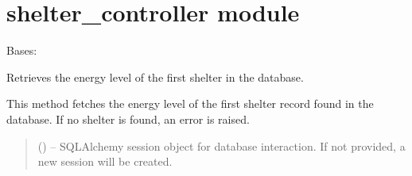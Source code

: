 \documentclass[letterpaper,10pt,english]{sphinxmanual}
\begin{document}
\section{shelter\_controller module}
\label{\detokenize{app.controllers:module-app.controllers.shelter_controller}}\label{\detokenize{app.controllers:shelter-controller-module}}

\begin{fulllineitems}
\label{\detokenize{app.controllers:app.controllers.shelter_controller.ShelterController}}
\pysigstartsignatures
\pysiglinewithargsret
{}
{}
{}
\pysigstopsignatures
\sphinxAtStartPar
Bases: 

\begin{fulllineitems}
\label{\detokenize{app.controllers:app.controllers.shelter_controller.ShelterController.get_shelter_energy_level}}
\pysigstartsignatures
\pysiglinewithargsret
{}
{}
{}
\pysigstopsignatures
\sphinxAtStartPar
Retrieves the energy level of the first shelter in the database.

\sphinxAtStartPar
This method fetches the energy level of the first shelter record found in the database.
If no shelter is found, an error is raised.
\begin{quote}\begin{description}
\sphinxAtStartPar
{} (\sphinxstyleliteralemphasis{\sphinxupquote{, }}) – SQLAlchemy session object for database interaction.
If not provided, a new session will be created.


\end{description}
\end{quote}
\end{fulllineitems}
\end{fulllineitems}
\end{document}
